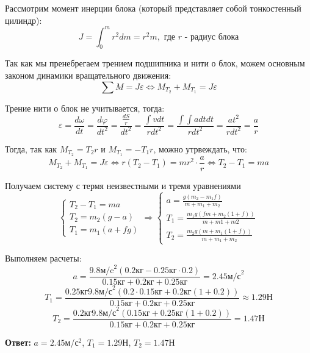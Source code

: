 \documentclass[a4paper,12pt]{article}
\begin{document}
    Рассмотрим момент инерции блока (который представляет собой тонкостенный цилиндр):
    \begin{equation}
        J = \int_0^m{r^2dm} = r^2m, \text{ где } r \text{ - радиус блока}
    \end{equation}

    Так как мы пренебрегаем трением подшипника и нити о блок, можем основным законом
    динамики вращательного движения:
    \begin{equation}
        \sum{M} = J\varepsilon \Leftrightarrow M_{T_2} + M_{T_1} = J\varepsilon
    \end{equation}

    Трение нити о блок не учитывается, тогда:
    \begin{equation}
        \varepsilon = \frac{d\omega}{dt} = \frac{d\varphi}{dt^2} = \frac{\frac{dS}{r}}{dt^2} = 
        \frac{\int vdt}{rdt^2} = \frac{\int \int a dtdt}{rdt^2} = \frac{at^2}{rdt^2} = \frac{a}{r}
    \end{equation}

    Тогда, так как $M_{T_2} = T_2r$ и $M_{T_1} = -T_1r$, можно утрвеждать, что:
    \begin{equation}
        M_{T_2} + M_{T_1} = J\varepsilon \Leftrightarrow r(T_2 - T_1) = mr^2 \cdot \frac{a}{r}
        \Leftrightarrow T_2 - T_1 = ma
    \end{equation}

    Получаем систему с термя неизвестными и тремя уравнениями
    \begin{equation}
        \begin{cases}
            T_2 - T_1 = ma \\
            T_2 = m_2(g - a) \\
            T_1 = m_1(a + fg)
        \end{cases} \Rightarrow
        \begin{cases}
            a = \frac{g(m_2 - m_1f)}{m + m_1 + m_2} \\
            T_1 = \frac{m_1g(fm + m_2(1 + f))}{m + m1 + m2} \\
            T_2 = \frac{m_2g(m + m_1(1 + f))}{m + m_1 + m_2}
        \end{cases}
    \end{equation}

    Выполняем расчеты:
    \begin{equation}
        a = \frac{9.8\text{м/c}^2(0.2\text{кг} - 0.25\text{кг}\cdot 0.2)}{0.15\text{кг} + 0.2\text{кг} + 0.25\text{кг}} = 2.45 \text{м/с}^2
    \end{equation}
    \begin{equation}
        T_1 = \frac{0.25\text{кг}9.8\text{м/с}^2(0.2\cdot 0.15\text{кг} + 0.2\text{кг}(1 + 0.2))}{0.15\text{кг} + 0.2\text{кг} + 0.25\text{кг}} \approx 1.29\text{Н}
    \end{equation}
    \begin{equation}
        T_2 = \frac{0.2\text{кг}9.8\text{м/с}^2(0.15\text{кг} + 0.25\text{кг}(1 + 0.2))}{0.15\text{кг} + 0.2\text{кг} + 0.25\text{кг}} = 1.47\text{Н}
    \end{equation}

    \begin{flushright}
        \textbf{Ответ:} $a = 2.45$м/с$^2$, $T_1 = 1.29$Н, $T_2 = 1.47$Н
    \end{flushright}
\end{document}
